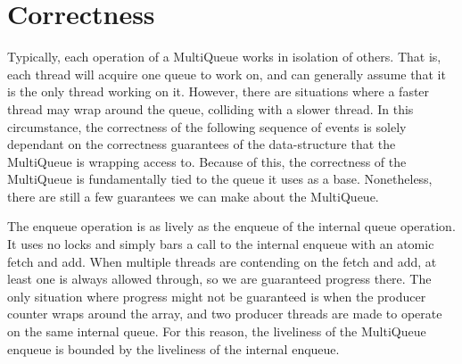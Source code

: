 \documentclass[12pt]{report}
\begin{document}
\begin{scriptsize}
\begin{algorithm}[H]
\end{algorithm}
\end{scriptsize}

\section{Correctness}
Typically, each operation of a MultiQueue works in isolation of others. That
is, each thread will acquire one queue to work on, and can generally assume
that it is the only thread working on it. However, there are situations where a
faster thread may wrap around the queue, colliding with a slower thread. In
this circumstance, the correctness of the following sequence of events is
solely dependant on the correctness guarantees of the data-structure that the
MultiQueue is wrapping access to. Because of this, the correctness of the
MultiQueue is fundamentally tied to the queue it uses as a base. Nonetheless,
there are still a few guarantees we can make about the MultiQueue.

The enqueue operation is as lively as the enqueue of the internal queue
operation. It uses no locks and simply bars a call to the internal enqueue with
an atomic fetch and add. When multiple threads are contending on the fetch and
add, at least one is always allowed through, so we are guaranteed progress
there. The only situation where progress might not be guaranteed is when the
producer counter wraps around the array, and two producer threads are made to
operate on the same internal queue. For this reason, the liveliness of the
MultiQueue enqueue is bounded by the liveliness of the internal enqueue.
\end{document}
